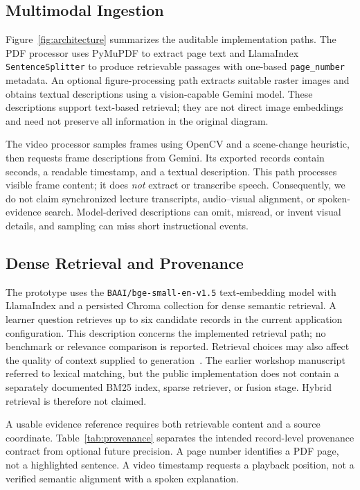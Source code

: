 \documentclass[manuscript,screen,nonacm]{acmart}
\begin{document}
\subsection{Multimodal Ingestion}
Figure~\ref{fig:architecture} summarizes the auditable implementation paths. The PDF processor uses PyMuPDF to extract page text and LlamaIndex \texttt{SentenceSplitter} to produce retrievable passages with one-based \texttt{page\_number} metadata. An optional figure-processing path extracts suitable raster images and obtains textual descriptions using a vision-capable Gemini model. These descriptions support text-based retrieval; they are not direct image embeddings and need not preserve all information in the original diagram.

The video processor samples frames using OpenCV and a scene-change heuristic, then requests frame descriptions from Gemini. Its exported records contain seconds, a readable timestamp, and a textual description. This path processes visible frame content; it does \emph{not} extract or transcribe speech. Consequently, we do not claim synchronized lecture transcripts, audio--visual alignment, or spoken-evidence search. Model-derived descriptions can omit, misread, or invent visual details, and sampling can miss short instructional events.

\subsection{Dense Retrieval and Provenance}
The prototype uses the \texttt{BAAI/bge-small-en-v1.5} text-embedding model with LlamaIndex and a persisted Chroma collection for dense semantic retrieval. A learner question retrieves up to six candidate records in the current application configuration. This description concerns the implemented retrieval path; no benchmark or relevance comparison is reported. Retrieval choices may also affect the quality of context supplied to generation~\cite{cuconasu2024noise}. The earlier workshop manuscript referred to lexical matching, but the public implementation does not contain a separately documented BM25 index, sparse retriever, or fusion stage. Hybrid retrieval is therefore not claimed.

A usable evidence reference requires both retrievable content and a source coordinate. Table~\ref{tab:provenance} separates the intended record-level provenance contract from optional future precision. A page number identifies a PDF page, not a highlighted sentence. A video timestamp requests a playback position, not a verified semantic alignment with a spoken explanation.
\end{document}
